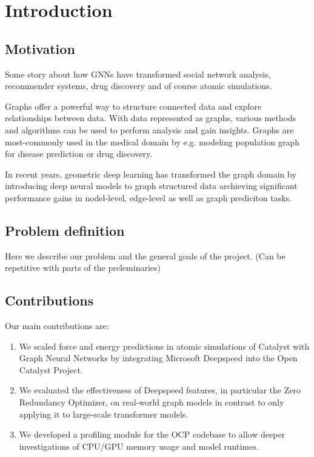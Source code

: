 \section{Introduction}

\subsection{Motivation}

Some story about how GNNs have transformed social network analysis, recommender systems, drug discovery and of course atomic simulations.

Graphs offer a powerful way to structure connected data and explore relationships between data. With data represented as graphs, various 
methods and algorithms can be used to perform analysis and gain insights. Graphs are most-commonly used in the medical domain by e.g. 
modeling population graph for disease prediction or drug discovery.

In recent years, geometric deep learning has transformed the graph domain by introducing deep neural models to graph structured data 
archieving significant performance gains in nodel-level, edge-level as well as graph prediciton tasks. 


\subsection{Problem definition}

Here we describe our problem and the general goals of the project. (Can be repetitive with parts of the preleminaries)

\subsection{Contributions}

Our main contributions are:

\begin{enumerate}
    \item We scaled force and energy predictions in atomic simulations of Catalyst with Graph Neural Networks 
    by integrating Microsoft Deepspeed into the Open Catalyst Project.
    \item We evaluated the effectiveness of Deepspeed features, in particular the Zero Redundancy Optimizer, on 
    real-world graph models in contrast to only applying it to large-scale transformer models.
    \item We developed a profiling module for the OCP codebase to allow deeper investigations of CPU/GPU memory 
    usage and model runtimes.
\end{enumerate}

